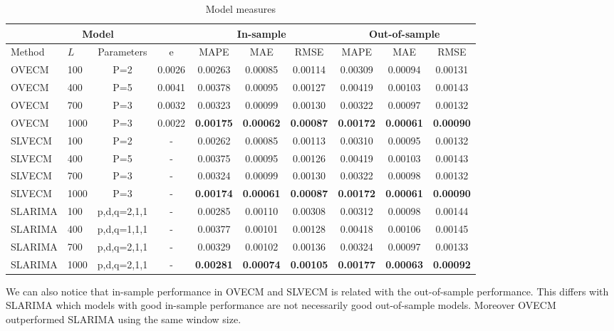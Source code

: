 \begin{table}[ht!]
\caption{Model measures}
\label{tab:stats}
\begin{center}
\tiny
\begin{tabular}{|l|l|c|c|c|c|c|c|c|c|}
\hline
\multicolumn{4}{|c|}{Model} & \multicolumn{3}{|c|}{In-sample} &
\multicolumn{3}{|c|}{Out-of-sample} \\ 
\hline
\hline
Method & $L$ & Parameters & e & 
MAPE & MAE& RMSE& 
MAPE & MAE& RMSE \\
\hline
 OVECM  &   100  &  P=2& 0.0026  &  0.00263&  0.00085&  0.00114&  0.00309&  0.00094&  0.00131\\
 OVECM  &   400  &  P=5& 0.0041  &  0.00378&  0.00095&  0.00127&  0.00419&  0.00103&  0.00143\\
 OVECM  &   700  &  P=3& 0.0032  &  0.00323&  0.00099&  0.00130&  0.00322&  0.00097&  0.00132\\
 OVECM  &   1000 &  P=3& 0.0022  &  
 \textbf{0.00175}&  \textbf{0.00062}&  \textbf{0.00087} &  
 \textbf{0.00172}&  \textbf{0.00061}&  \textbf{0.00090}\\
\hline
 SLVECM  &   100 &  P=2& -  &  0.00262&  0.00085&  0.00113&  0.00310&  0.00095&  0.00132\\
 SLVECM  &   400 &  P=5& -  &  0.00375&  0.00095&  0.00126&  0.00419&  0.00103&  0.00143\\
 SLVECM  &   700 &  P=3& -  &  0.00324&  0.00099&  0.00130&  0.00322&  0.00098&  0.00132\\
 SLVECM  &   1000 &  P=3& -  &  
 \textbf{0.00174}&  \textbf{0.00061}&  \textbf{0.00087}&  
 \textbf{0.00172}&  \textbf{0.00061}&  \textbf{0.00090}\\
\hline
SLARIMA & 100  &p,d,q=2,1,1 & - & 0.00285  &  0.00110  &  0.00308  &  0.00312  &0.00098  &  0.00144 \\
SLARIMA & 400  &p,d,q=1,1,1 & - & 0.00377  &  0.00101  &  0.00128  &  0.00418 & 0.00106 & 0.00145 \\
SLARIMA & 700  &p,d,q=2,1,1 & - & 0.00329  &  0.00102  &  0.00136  &  0.00324  & 0.00097  &  0.00133 \\
SLARIMA & 1000 &p,d,q=2,1,1 & - & \textbf{0.00281}  & \textbf{0.00074}  &  \textbf{0.00105}  &  \textbf{0.00177} & \textbf{0.00063}  &  \textbf{0.00092} \\
\hline
\end{tabular}
\end{center}
\end{table}

We can also notice that in-sample performance in OVECM and SLVECM is related
with the out-of-sample performance.  This differs with SLARIMA which models with
good in-sample performance are not necessarily good out-of-sample models.
Moreover OVECM outperformed SLARIMA using the same window size.

